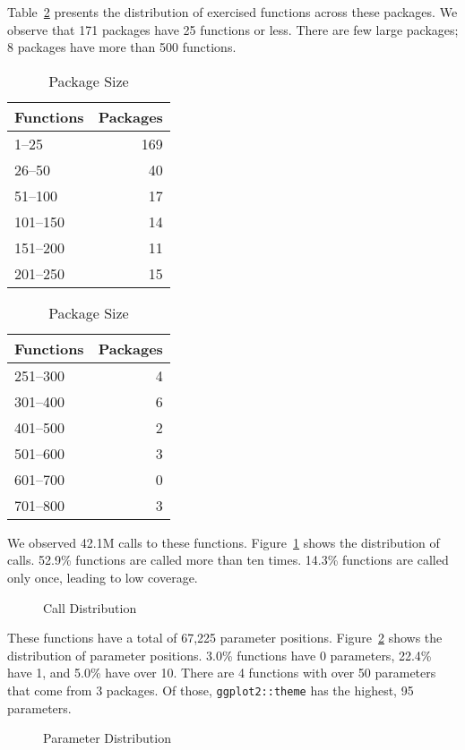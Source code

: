 \documentclass[10pt,review,sigplan,anonymous=true,authorversion=true,nonacm=true]{acmart}
\begin{document}
Table~\ref{table:packsize} presents the distribution of exercised functions
across these packages. We observe that 171 packages have 25 functions or less.
There are few large packages; 8 packages have more than 500 functions.

\begin{table}[!h]
  \vspace{-2mm}
  \small
  \caption{Package Size} \label{table:packsize}
  \centering
  \begin{tabular}{lr}
    \toprule
    \bf Functions&\bf Packages\\
    \midrule
    1--25&169\\
    26--50&40\\
    51--100&17\\
    101--150&14\\
    151--200&11\\
    201--250&15\\
    \bottomrule
  \end{tabular}
  \quad
  \begin{tabular}{lr}
    \toprule
    \bf Functions&\bf Packages\\
    \midrule
    251--300&4\\
    301--400&6\\
    401--500&2\\
    501--600&3\\
    601--700&0\\
    701--800&3\\
    \bottomrule
  \end{tabular}
\end{table}

We observed 42.1M calls to these functions. Figure~\ref{fig:calldist} shows the
distribution of calls. 52.9\% functions are called more than ten times. 14.3\%
functions are called only once, leading to low coverage.

\begin{figure}[!h]
  \centering
  
  \caption{Call Distribution}
  \label{fig:calldist}
\end{figure}

These functions have a total of 67,225 parameter positions.
Figure~\ref{fig:paramdist} shows the distribution of parameter positions. 3.0\%
functions have 0 parameters, 22.4\% have 1, and 5.0\% have over 10. There are 4
functions with over 50 parameters that come from 3 packages. Of those,
\texttt{ggplot2::theme} has the highest, 95 parameters.

\begin{figure}[!h]
  \centering
  
  \caption{Parameter Distribution}
  \label{fig:paramdist}
\end{figure}
\end{document}
